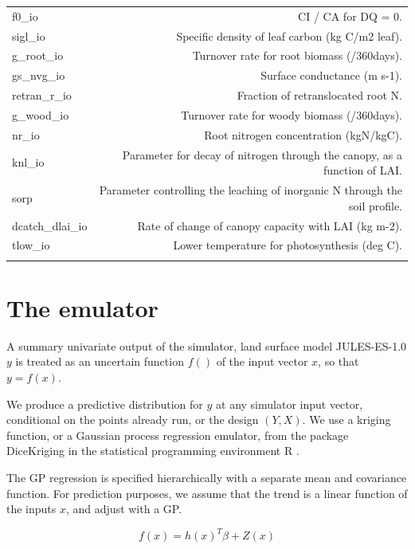 \documentclass[gmd, manuscript]{copernicus}
\begin{document}
\begin{table}[t]
\begin{tabular}{l r}
  f0\_io & CI / CA for DQ = 0. \\ 
  sigl\_io & Specific density of leaf carbon (kg C/m2 leaf).\\ 
  g\_root\_io & Turnover rate for root biomass (/360days). \\ 
  gs\_nvg\_io & Surface conductance (m s-1). \\ 
  retran\_r\_io & Fraction of retranslocated root N.\\ 
  g\_wood\_io &  Turnover rate for woody biomass (/360days).\\ 
  nr\_io &  Root nitrogen concentration (kgN/kgC).\\ 
  knl\_io & Parameter for decay of nitrogen through the canopy, as a function of LAI.\\ 
  sorp & Parameter controlling the leaching of inorganic N through the soil profile. \\ 
  dcatch\_dlai\_io &Rate of change of canopy capacity with LAI (kg m-2).  \\ 
  tlow\_io & Lower temperature for photosynthesis (deg C).\\  
\bottomhline
\end{tabular}
\belowtable{} %

\end{table}


\section{The emulator}

A summary univariate output of the simulator, land surface model JULES-ES-1.0 $y$ is treated as an uncertain function $f()$ of the input vector $x$, so that $y = f(x)$. 

We produce a predictive distribution for $y$ at any simulator input vector, conditional on the points already run, or the design $(Y, X)$. We use a kriging function, or a Gaussian process regression emulator, from the package DiceKriging \citep{roustant2012dicekriging} in the statistical programming environment R \citep{Rcore2016}.

The GP regression is specified hierarchically with a separate mean and covariance function. For prediction purposes, we assume that the trend is a linear function of the inputs $x$, and adjust with a GP. 

$$
f(x) = h(x)^T \beta + Z(x)
$$
\end{document}
